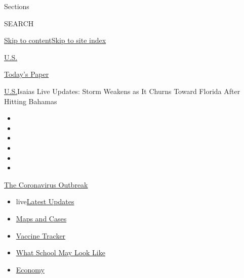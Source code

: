 Sections

SEARCH

\protect\hyperlink{site-content}{Skip to
content}\protect\hyperlink{site-index}{Skip to site index}

\href{https://www.nytimes.com/section/us}{U.S.}

\href{https://myaccount.nytimes.com/auth/login?response_type=cookie\&client_id=vi}{}

\href{https://www.nytimes.com/section/todayspaper}{Today's Paper}

\href{/section/us}{U.S.}\textbar{}Isaias Live Updates: Storm Weakens as
It Churns Toward Florida After Hitting Bahamas

\begin{itemize}
\item
\item
\item
\item
\item
\item
\end{itemize}

\href{https://www.nytimes.com/news-event/coronavirus?action=click\&pgtype=Article\&state=default\&region=TOP_BANNER\&context=storylines_menu}{The
Coronavirus Outbreak}

\begin{itemize}
\tightlist
\item
  live\href{https://www.nytimes.com/2020/08/01/world/coronavirus-covid-19.html?action=click\&pgtype=Article\&state=default\&region=TOP_BANNER\&context=storylines_menu}{Latest
  Updates}
\item
  \href{https://www.nytimes.com/interactive/2020/us/coronavirus-us-cases.html?action=click\&pgtype=Article\&state=default\&region=TOP_BANNER\&context=storylines_menu}{Maps
  and Cases}
\item
  \href{https://www.nytimes.com/interactive/2020/science/coronavirus-vaccine-tracker.html?action=click\&pgtype=Article\&state=default\&region=TOP_BANNER\&context=storylines_menu}{Vaccine
  Tracker}
\item
  \href{https://www.nytimes.com/interactive/2020/07/29/us/schools-reopening-coronavirus.html?action=click\&pgtype=Article\&state=default\&region=TOP_BANNER\&context=storylines_menu}{What
  School May Look Like}
\item
  \href{https://www.nytimes.com/live/2020/07/31/business/stock-market-today-coronavirus?action=click\&pgtype=Article\&state=default\&region=TOP_BANNER\&context=storylines_menu}{Economy}
\end{itemize}

